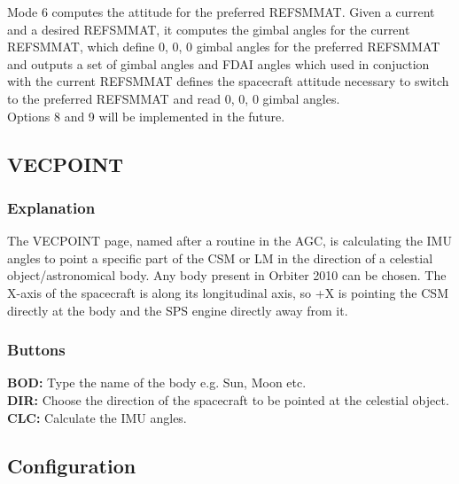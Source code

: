 \documentclass[11pt]{article} %
\begin{document}
Mode 6 computes the attitude for the preferred REFSMMAT. Given a current and a desired REFSMMAT, it computes the gimbal angles for the current REFSMMAT, which define 0, 0, 0 gimbal angles for the preferred REFSMMAT and outputs a set of gimbal angles and FDAI angles which used in conjuction with the current REFSMMAT defines the spacecraft attitude necessary to switch to the preferred REFSMMAT and read 0, 0, 0 gimbal angles.\\

Options 8 and 9 will be implemented in the future.\\
\newpage
\subsection{VECPOINT}

\subsubsection{Explanation}

The VECPOINT page, named after a routine in the AGC, is calculating the IMU angles to point a specific part of the CSM or LM in the direction of a celestial object/astronomical body. Any body present in Orbiter 2010 can be chosen. The X-axis of the spacecraft is along its longitudinal axis, so +X is pointing the CSM directly at the body and the SPS engine directly away from it.\\

\subsubsection{Buttons}

\textbf{BOD:} Type the name of the body e.g. Sun, Moon etc.\\
\textbf{DIR:} Choose the direction of the spacecraft to be pointed at the celestial object.\\
\textbf{CLC:} Calculate the IMU angles.\\
\newpage
\subsection{Configuration}
\end{document}
